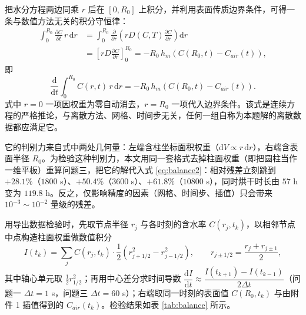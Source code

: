 \documentclass[12pt,a4paper]{article}
\begin{document}
把水分方程两边同乘 $r$ 后在 $[0,R_0]$ 上积分，并利用表面传质边界条件，可得一条与数值方法无关的积分守恒律：
\begin{equation}
\begin{aligned}
\int_0^{R_0}\frac{\partial C}{\partial t}\,r\,\mathrm{d}r
&=\int_0^{R_0}\frac{\partial}{\partial r}\left(rD(C,T)\frac{\partial C}{\partial r}\right)\mathrm{d}r\\
&=\left[rD\frac{\partial C}{\partial r}\right]_{0}^{R_0}
=-R_0\,h_m\left(C(R_0,t)-C_{air}(t)\right),
\end{aligned}
\end{equation}
即
\begin{equation}
\frac{\mathrm{d}}{\mathrm{d}t}\int_0^{R_0}C(r,t)\,r\,\mathrm{d}r=-R_0\,h_m\left(C(R_0,t)-C_{air}(t)\right).
\label{eq:balance2}
\end{equation}
式中 $r=0$ 一项因权重为零自动消去，$r=R_0$ 一项代入边界条件。该式是连续方程的严格推论，与离散方法、网格、时间步无关，任何一组自称为本题解的离散数据都应满足它。

它的判别力来自式中两处几何量：左端含柱坐标面积权重（$\mathrm{d}V\propto r\,\mathrm{d}r$），右端含表面半径 $R_0$。为检验这种判别力，本文用同一套格式去掉柱面权重（即把圆柱当作一维平板）重算问题三，把它的解代入式 \eqref{eq:balance2}：相对残差立刻跳到 $+28.1\%$（$1800$ s）、$+50.4\%$（$3600$ s）、$+61.8\%$（$10800$ s），同时烘干时长由 $57$ h 变为 $119.8$ h。反之，仅影响精度的因素（网格、时间步、插值）只会带来 $10^{-3}\sim10^{-2}$ 量级的残差。

用导出数据检验时，先取节点半径 $r_j$ 与各时刻的含水率 $C(r_j,t_k)$，以相邻节点中点构造柱面权重做数值积分
\begin{equation}
I(t_k)=\sum_{j}C(r_j,t_k)\cdot\frac{1}{2}\left(r_{j+1/2}^{2}-r_{j-1/2}^{2}\right),\qquad r_{j\pm1/2}=\frac{r_j+r_{j\pm1}}{2},
\end{equation}
其中轴心单元取 $\frac{1}{2}r_{1/2}^{2}$；再用中心差分求时间导数 $\dfrac{\mathrm{d}I}{\mathrm{d}t}\approx\dfrac{I(t_{k+1})-I(t_{k-1})}{2\Delta t}$（问题一 $\Delta t=1$ s，问题三 $\Delta t=60$ s）；右端取同一时刻的表面值 $C(R_0,t_k)$ 与由附件 1 插值得到的 $C_{air}(t_k)$。检验结果如表 \ref{tab:balance} 所示。
\end{document}
